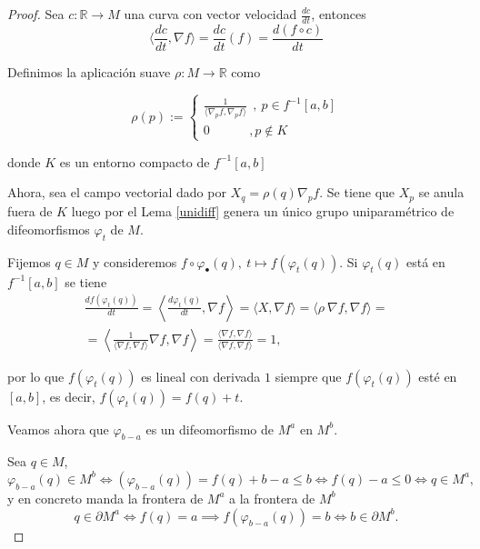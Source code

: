 \begin{proof}
    Sea $c:\mathbb{R}\to M$ una curva con vector velocidad $\frac{dc}{dt}$, entonces
    \begin{equation*}
        \langle \frac{dc}{dt}, \nabla f\rangle = \frac{dc}{dt}(f)=\frac{d(f\circ c)}{dt}
    \end{equation*}

    Definimos la aplicación suave $\rho : M\to \mathbb{R}$ como

    \begin{equation*}
        \rho(p):=
        \begin{cases}
            \frac{1}{\langle \nabla_pf, \nabla_pf\rangle}~~,~p\in f^{-1}[a,b]\\
            0 ~~~~~~~~~~~~~~,p\notin K
        \end{cases}
    \end{equation*}

    donde $K$ es un entorno compacto de $f^{-1}[a,b]$

    Ahora, sea el campo vectorial dado por $X_q=\rho(q)\nabla_pf$. Se tiene que $X_p$ se anula fuera de $K$ luego por el Lema \ref{unidiff} genera un único grupo uniparamétrico de difeomorfismos $\varphi_t$ de $M$.

    Fijemos $q\in M$ y consideremos $f\circ\varphi_{\bullet}(q),~t\mapsto f(\varphi_t(q))$. Si $\varphi_t(q)$ está en $f^{-1}[a,b]$ se tiene
    \begin{align*}
        \frac{df(\varphi_t(q))}{dt} = \left\langle \frac{d\varphi_t(q)}{dt},\nabla f\right\rangle = \langle X, \nabla f\rangle = \langle \rho~ \nabla f, \nabla f\rangle =\\ =\left\langle \frac{1}{\langle \nabla f,\nabla f\rangle}\nabla f,\nabla f\right\rangle=
        \frac{\langle \nabla f,\nabla f\rangle}{\langle \nabla f,\nabla f\rangle}= 1,
    \end{align*}

    por lo que $f(\varphi_t(q))$ es lineal con derivada $1$ siempre que $f(\varphi_t(q))$ esté en $[a,b]$, es decir, $f(\varphi_t(q))=f(q)+t$.

    Veamos ahora que $\varphi_{b-a}$ es un difeomorfismo de $M^a$ en $M^b$.

    Sea $q\in M$,
    \begin{equation*}
        \varphi_{b-a}(q)\in M^b \iff(\varphi_{b-a}(q))=f(q)+b-a\le b \iff f(q)-a\le 0 \iff q\in M^a,
    \end{equation*}
     y en concreto manda la frontera de $M^a$ a la frontera de $M^b$
     \begin{equation*}
         q\in \partial M^a \iff f(q)=a \implies f(\varphi_{b-a}(q))=b \iff b\in \partial M^b.
     \end{equation*}


\end{proof}
